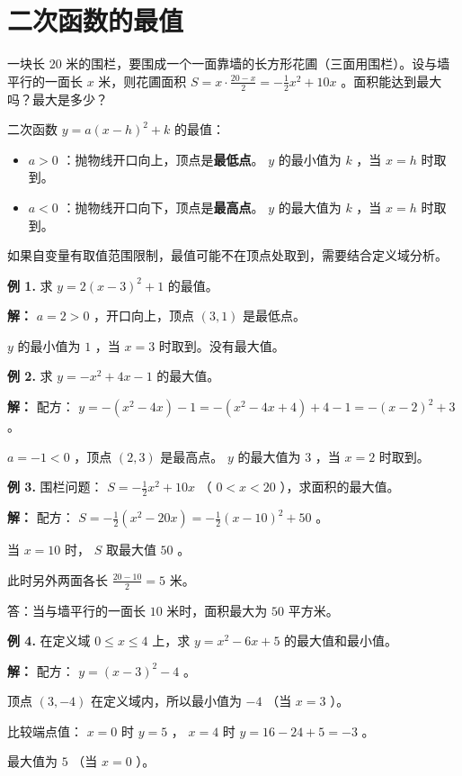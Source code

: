 \section*{二次函数的最值}


\begin{explore}


一块长 $20$ 米的围栏，要围成一个一面靠墙的长方形花圃（三面用围栏）。设与墙平行的一面长 $x$ 米，则花圃面积 $S = x \cdot \frac{20 - x}{2} = -\frac{1}{2}x^2 + 10x$ 。面积能达到最大吗？最大是多少？

\end{explore}

\begin{understand}


二次函数 $y = a(x - h)^2 + k$ 的最值：

\begin{itemize}
  \item $a > 0$ ：抛物线开口向上，顶点是\textbf{最低点}。 $y$ 的最小值为 $k$ ，当 $x = h$ 时取到。
  \item $a < 0$ ：抛物线开口向下，顶点是\textbf{最高点}。 $y$ 的最大值为 $k$ ，当 $x = h$ 时取到。
\end{itemize}


如果自变量有取值范围限制，最值可能不在顶点处取到，需要结合定义域分析。

\end{understand}

\begin{workedexamples}


\textbf{例 1.} 求 $y = 2(x - 3)^2 + 1$ 的最值。

\textbf{解：} $a = 2 > 0$ ，开口向上，顶点 $(3, 1)$ 是最低点。

$y$ 的最小值为 $1$ ，当 $x = 3$ 时取到。没有最大值。

\textbf{例 2.} 求 $y = -x^2 + 4x - 1$ 的最大值。

\textbf{解：} 配方： $y = -(x^2 - 4x) - 1 = -(x^2 - 4x + 4) + 4 - 1 = -(x - 2)^2 + 3$ 。

$a = -1 < 0$ ，顶点 $(2, 3)$ 是最高点。 $y$ 的最大值为 $3$ ，当 $x = 2$ 时取到。

\textbf{例 3.} 围栏问题： $S = -\frac{1}{2}x^2 + 10x$ （ $0 < x < 20$ ），求面积的最大值。

\textbf{解：} 配方： $S = -\frac{1}{2}(x^2 - 20x) = -\frac{1}{2}(x - 10)^2 + 50$ 。

当 $x = 10$ 时， $S$ 取最大值 $50$ 。

此时另外两面各长 $\frac{20 - 10}{2} = 5$ 米。

答：当与墙平行的一面长 $10$ 米时，面积最大为 $50$ 平方米。

\textbf{例 4.} 在定义域 $0 \leq x \leq 4$ 上，求 $y = x^2 - 6x + 5$ 的最大值和最小值。

\textbf{解：} 配方： $y = (x - 3)^2 - 4$ 。

顶点 $(3, -4)$ 在定义域内，所以最小值为 $-4$ （当 $x = 3$ ）。

比较端点值： $x = 0$ 时 $y = 5$ ， $x = 4$ 时 $y = 16 - 24 + 5 = -3$ 。

最大值为 $5$ （当 $x = 0$ ）。

\end{workedexamples}

